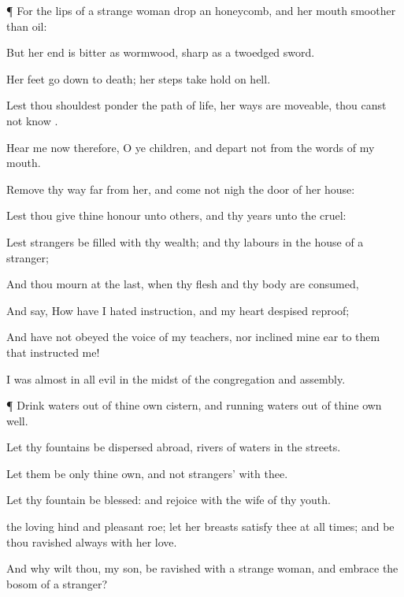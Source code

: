 {\par }{\PP {}¶ For the
lips of a strange
woman
drop
{} an
honeycomb, and her
mouth
{}
smoother than
oil:

But her
end is
bitter as
wormwood,
sharp as a
twoedged
sword.

Her
feet go
down to
death; her
steps take
hold on
hell.

Lest thou shouldest
ponder the
path of
life, her
ways are
moveable,
{} thou canst not
know
{}.

Hear me now therefore, O ye
children, and
depart not from the
words of my
mouth.

Remove thy
way
far from her, and come not
nigh the
door of her
house:

Lest thou
give thine
honour unto
others, and thy
years unto the
cruel:

Lest
strangers be
filled with thy
wealth; and thy
labours
{} in the
house of a
stranger;

And thou
mourn at the
last, when thy
flesh and thy
body are
consumed,

And
say, How have I
hated
instruction, and my
heart
despised
reproof;

And have not
obeyed the
voice of my
teachers, nor
inclined mine
ear to them that
instructed me!

I was
almost in all
evil in the
midst of the
congregation and
assembly.


\par }{\PP {}¶
Drink
waters out of thine own
cistern, and running
waters out
of thine own
well.

Let thy
fountains be
dispersed
abroad,
{}
rivers of
waters in the
streets.

Let them be only thine own, and not
strangers’ with thee.

Let thy
fountain be
blessed: and
rejoice with the
wife of thy
youth.

 the
loving
hind and
pleasant
roe; let her
breasts
satisfy thee at all
times; and be thou
ravished
always with her
love.

And why wilt thou, my
son, be
ravished with a strange
woman, and
embrace the
bosom of a
stranger?

}
